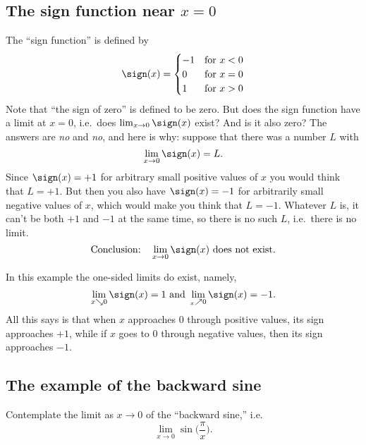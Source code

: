 \subsection{The sign function near $x=0$}
\label{sec:sign-function-has-no-limit}
The ``sign function'' is defined by%
%
\[
\sign (x) =
\begin{cases}
  -1 & \text{for $x<0$}\\ 0 & \text{for $x=0$}\\ 1 & \text{for $x>0$}
\end{cases}
\]
Note that ``the sign of zero'' is defined to be zero.  But does the
sign function have a limit at $x=0$, i.e.\ does $ \lim_{x\to0}
\sign(x) $ exist?  And is it also zero? The answers are \emph{no} and
\emph{no}, and here is why: suppose that there was a number $L$ with
\[
 \lim_{x\to 0}\sign(x) = L.
\]
Since $\sign(x) = +1$ for arbitrary small positive values of $x$ you
would think that $L=+1$.  But then you also have $\sign(x)
= -1$ for arbitrarily small negative values of $x$, which would make
you think that $L=-1$.  Whatever $L$ is, it can't be both $+1$
and $-1$ at the same time, so there is no such $L$, i.e.\ there is no limit.
\[
\text{Conclusion:}\quad
\lim_{x\to 0} \sign (x) \text{ does not exist.}
\]

In this example the one-sided limits do exist, namely,
\[
\lim_{x\searrow0}\sign(x) = 1 \text{ and } \lim_{_x\nearrow0}\sign(x) = -1.
\]
All this says is that when $x$ approaches 0 through positive values, its
sign approaches $+1$, while if $x$ goes to 0 through negative values, then
its sign approaches $-1$.

\subsection{The example of the backward sine}
\label{sec:03backward-sine}
Contemplate the limit as $x\to0$ of the ``backward sine,'' i.e.
\[
\lim_{x\to 0}\sin \bigl(\frac\pi x\bigr).
\]

